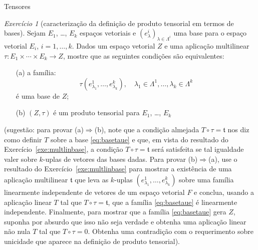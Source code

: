 \documentclass[oneside,11pt]{amsart}
\theoremstyle{remark}\newtheorem{exercise}{Exercício}[section]
\theoremstyle{plain}\newtheorem{teo}{Teorema}[section]
\theoremstyle{plain}\newtheorem{lem}[teo]{Lema}
\theoremstyle{plain}\newtheorem{prop}[teo]{Proposição}
\theoremstyle{definition}\newtheorem{defin}[teo]{Definição}
\theoremstyle{remark}\newtheorem{rem}[teo]{Observação}
\theoremstyle{definition}\newtheorem{example}[teo]{Exemplo}
\numberwithin{equation}{section}
\begin{document}
\begin{section}{Tensores}
\begin{exercise}[caracterização da definição de produto tensorial em termos de bases]\label{exe:tensorbases}
Sejam $E_1$, \dots, $E_k$ espaços vetoriais e $(e^i_\lambda)_{\lambda\in\Lambda^i}$ uma base para o espaço vetorial $E_i$, $i=1,\ldots,k$.
Dados um espaço vetorial $Z$ e uma aplicação multilinear $\tau:E_1\times\cdots\times E_k\to Z$, mostre que as seguintes condições são equivalentes:
\begin{itemize}
\item[(a)] a família:
\begin{equation}\label{eq:basetaue}
\tau(e^1_{\lambda_1},\ldots,e^k_{\lambda_k}),\quad\lambda_1\in\Lambda^1,\ldots,\lambda_k\in\Lambda^k
\end{equation}
é uma base de $Z$;
\item[(b)] $(Z,\tau)$ é um produto tensorial para $E_1$, \dots, $E_k$
\end{itemize}
(sugestão: para provar (a)$\Rightarrow$(b), note que a condição almejada $T\circ\tau=\mathfrak t$ nos diz como definir $T$ sobre a base \eqref{eq:basetaue}
e que, em vista do resultado do Exercício~\ref{exe:multlinbase}, a condição $T\circ\tau=\mathfrak t$ será satisfeita se tal igualdade valer sobre $k$-uplas de vetores
das bases dadas. Para provar (b)$\Rightarrow$(a), use o resultado do Exercício~\ref{exe:multlinbase} para mostrar a existência de uma aplicação multilinear
$\mathfrak t$ que leva as $k$-uplas $(e^1_{\lambda_1},\ldots,e^k_{\lambda_k})$ sobre uma família linearmente independente de vetores de um espaço vetorial $F$
e conclua, usando a aplicação
linear $T$ tal que $T\circ\tau=\mathfrak t$, que a família \eqref{eq:basetaue} é linearmente independente. Finalmente, para mostrar que a família
\eqref{eq:basetaue} gera $Z$, suponha por absurdo que isso não seja verdade e obtenha uma aplicação linear não nula $T$ tal que $T\circ\tau=0$. Obtenha
uma contradição com o requerimento sobre unicidade que aparece na definição de produto tensorial).
\end{exercise}


\end{section}
\end{document}
